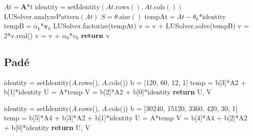 \begin{algorithm}
	\caption{Matrix Exponential Approximation from Contour Integrals} 
	\begin{algorithmic}[1]
		\State $At = \boldsymbol{A}$*$t$
		\State $\text{identity} = \text{setIdentity}(At.\text{rows}(), At.\text{cols}()) $
		\State $\text{LUSolver}.\text{analyzePattern}(At)$ 
		\State $S = \theta.\text{size}()$
		    \State $\text{tempAt} = At - \theta_{k}$*$\text{identity}$
		    \State $\text{tempB} = \alpha_{k}$*$\boldsymbol{v}_{0}$
		    \State LUSolver.factorize(tempAt) 
		    \State v = v + LUSolver.solve(tempB) 
		\EndFor
		\State v = 2*v.real()
		\State v = v + $\alpha_{0}$*$v_{0}$ 
		\State ${\text{\textbf{return}}}$ v
		\EndProcedure
	\end{algorithmic} 
	\label{alg:cauchy}
\end{algorithm}

\FloatBarrier
\subsection{Pad\'e}
\begin{algorithm}
	\caption{Pad\'e of Order 3} 
	\begin{algorithmic}[1]
		\State identity = setIdentity($A$.rows(), $A$.cols())
		\State b = [120, 60, 12, 1]
		\State temp = b[3]*A2 + b[1]*identity
		\State U = A*temp
        \State V = b[2]*A2 + b[0]*identity
        \State \textbf{return} U, V
        \EndProcedure
	\end{algorithmic} 
\end{algorithm}

\begin{algorithm}
	\caption{Pad\'e of Order 5} 
	\begin{algorithmic}[1]
		\State identity = setIdentity($A$.rows(), $A$.cols())
		\State b = [30240, 15120, 3360, 420, 30, 1]
		\State temp = b[5]*A4 + b[3]*A2 + b[1]*identity
		\State U = A*temp
        \State V = b[4]*A4 + b[2]*A2 + b[0]*identity
        \State \textbf{return} U, V
        \EndProcedure
	\end{algorithmic} 
\end{algorithm}

